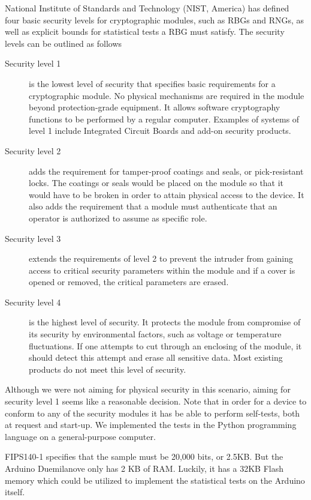 \documentclass[a4paper]{article}           %
\begin{document}
National Institute of Standards and Technology (NIST, America) has defined ~\cite{fips140} four basic security levels for cryptographic modules, such as RBGs and RNGs, as well as explicit bounds for statistical tests a RBG must satisfy. The security levels can be outlined as follows

\begin{description}
\item[Security level 1] is the lowest level of security that specifies basic requirements for a cryptographic module. No physical mechanisms are required in the module beyond protection-grade equipment. It allows software cryptography functions to be performed by a regular computer. Examples of systems of level 1 include Integrated Circuit Boards and add-on security products. 

\item[Security level 2] adds the requirement for tamper-proof coatings and seals, or pick-resistant locks. The coatings or seals would be placed on the module so that it would have to be broken in order to attain physical access to the device. It also adds the requirement that a module must authenticate that an operator is authorized to assume as specific role. 

\item[Security level 3] extends the requirements of level 2 to prevent the intruder from gaining access to critical security parameters within the module and if a cover is opened or removed, the critical parameters are erased. 

\item[Security level 4] is the highest level of security. It protects the module from compromise of its security by environmental factors, such as voltage or temperature fluctuations. If one attempts to cut through an enclosing of the module, it should detect this attempt and erase all sensitive data. Most existing products do not meet this level of security. 
\end{description}

Although we were not aiming for physical security in this scenario, aiming for security level 1 seems like a reasonable decision. Note that in order for a device to conform to any of the security modules it has be able to perform self-tests, both at request and start-up. We implemented the tests in the Python programming language on a general-purpose computer. 

FIPS140-1 specifies that the sample must be 20,000 bits, or 2.5KB. But the Arduino Duemilanove only has 2 KB of RAM. Luckily, it has a 32KB Flash memory which could be utilized to implement the statistical tests on the Arduino itself. 
\end{document}

